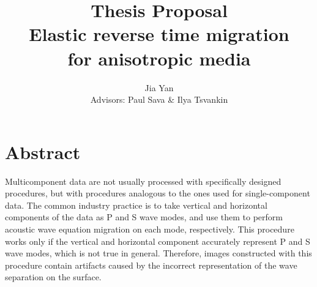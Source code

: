 \title{\textbf{Thesis Proposal} \\ 
\LARGE{Elastic reverse time migration\\ for anisotropic media}}
\author{\large\textup{ Jia Yan}\\ Advisors: Paul Sava \& Ilya Tsvankin}








\footnotesize
\tableofcontents
\newpage
\normalsize
{}
\listoffigures
\newpage



\def\CURL#1{\nabla \times {#1}}
\def\GRAD#1{\nabla {#1}}
\def\DIV#1{\nabla \cdot {#1}}
\def\LAPL#1{\nabla^2 {#1}}

\def\uu{\mathbf u}

\def\xx{ x,z}
\def\ofx { \lp \xx   \rp}
\def\ofxt{ \lp \xx,t \rp}

\def\IM#1{  {I}_{#1} \ofx }
\def\US#1{{u_s}_{#1} \ofxt}
\def\UR#1{{u_r}_{#1} \ofxt}

\def\P#1{ P_{#1} \ofxt }
\def\S#1{ S_{#1} \ofxt }
%



\section{Abstract}
Multicomponent data are not usually processed with specifically designed procedures, but with procedures analogous to the ones used for single-component data. The common industry practice is to take vertical and horizontal components of the data as P and S wave modes, and use them to perform acoustic wave equation migration on each mode, respectively. This procedure works only if the vertical and horizontal component accurately represent P and S wave modes, which is not true in general. Therefore, images constructed with this procedure contain artifacts caused by the incorrect representation of the wave separation on the surface.


